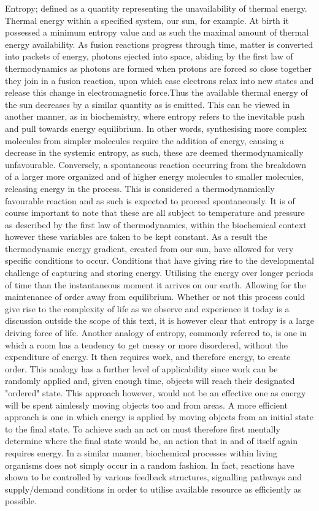 Entropy; defined as a quantity representing the unavailability of thermal energy. Thermal energy within a specified system, our sun, for example. At birth it possessed a minimum entropy value and as such the maximal amount of thermal energy availability. As fusion reactions progress through time, matter is converted into packets of energy, photons ejected into space, abiding by the first law of thermodynamics as photons are formed when protons are forced so close together they join in a fusion reaction, upon which case electrons relax into new states and release this change in electromagnetic force.Thus the available thermal energy of the sun decreases by a similar quantity as is emitted. This can be viewed in another manner, as in biochemistry, where entropy refers to the inevitable push and pull towards energy equilibrium. In other words, synthesising more complex molecules from simpler molecules require the addition of energy, causing a decrease in the systemic entropy, as such, these are deemed thermodynamically unfavourable. Conversely, a spontaneous reaction occurring from the breakdown of a larger more organized and of higher energy molecules to smaller molecules, releasing energy in the process. This is considered a thermodynamically favourable reaction and as such is expected to proceed spontaneously. It is of course important to note that these are all subject to temperature and pressure as described by the first law of thermodynamics, within the biochemical context however these variables are taken to be kept constant. As a result the thermodynamic energy gradient, created from our sun, have allowed for very specific conditions to occur. Conditions that have giving rise to the developmental challenge of capturing and storing energy. Utilising the energy over longer periods of time than the instantaneous moment it arrives on our earth. Allowing for the maintenance of order away from equilibrium. Whether or not this process could give rise to the complexity of life as we observe and experience it today is a discussion outside the scope of this text, it is however clear that entropy is a large driving force of life. 
Another analogy of entropy, commonly referred to, is one in which a room has a tendency to get messy or more disordered, without the expenditure of energy. It then requires work, and therefore energy, to create order. This analogy has a further level of applicability since work can be randomly applied and, given enough time, objects will reach their designated "ordered" state. This approach however, would not be an effective one as energy will be spent aimlessly moving objects too and from areas. A more efficient approach is one in which energy is applied by moving objects from an initial state to the final state. To achieve such an act on must therefore first mentally determine where the final state would be, an action that in and of itself again requires energy. In a similar manner, biochemical processes within living organisms does not simply occur in a random fashion. In fact, reactions have shown to be controlled by various feedback structures, signalling pathways and supply/demand conditions in order to utilise available resource as efficiently as possible.


